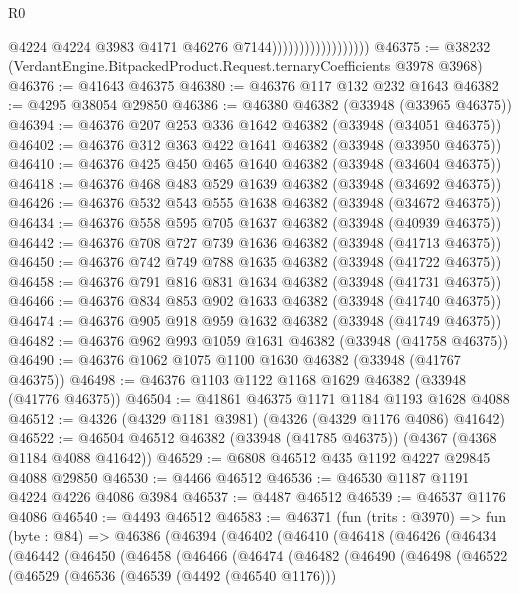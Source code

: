 \begin{lexlean}{R0}
\begin{coremodule}
                                        @4224
                                        @4224
                                        @3983
                                        @4171
                                        @46276
                                        @7144))))))))))))))))))
@46375 := @38232 (VerdantEngine.BitpackedProduct.Request.ternaryCoefficients @3978 @3968)
@46376 := @41643 @46375
@46380 := @46376 @117 @132 @232 @1643
@46382 := @4295 @38054 @29850
@46386 := @46380 @46382 (@33948 (@33965 @46375))
@46394 := @46376 @207 @253 @336 @1642 @46382 (@33948 (@34051 @46375))
@46402 := @46376 @312 @363 @422 @1641 @46382 (@33948 (@33950 @46375))
@46410 := @46376 @425 @450 @465 @1640 @46382 (@33948 (@34604 @46375))
@46418 := @46376 @468 @483 @529 @1639 @46382 (@33948 (@34692 @46375))
@46426 := @46376 @532 @543 @555 @1638 @46382 (@33948 (@34672 @46375))
@46434 := @46376 @558 @595 @705 @1637 @46382 (@33948 (@40939 @46375))
@46442 := @46376 @708 @727 @739 @1636 @46382 (@33948 (@41713 @46375))
@46450 := @46376 @742 @749 @788 @1635 @46382 (@33948 (@41722 @46375))
@46458 := @46376 @791 @816 @831 @1634 @46382 (@33948 (@41731 @46375))
@46466 := @46376 @834 @853 @902 @1633 @46382 (@33948 (@41740 @46375))
@46474 := @46376 @905 @918 @959 @1632 @46382 (@33948 (@41749 @46375))
@46482 := @46376 @962 @993 @1059 @1631 @46382 (@33948 (@41758 @46375))
@46490 := @46376 @1062 @1075 @1100 @1630 @46382 (@33948 (@41767 @46375))
@46498 := @46376 @1103 @1122 @1168 @1629 @46382 (@33948 (@41776 @46375))
@46504 := @41861 @46375 @1171 @1184 @1193 @1628 @4088
@46512 := @4326 (@4329 @1181 @3981) (@4326 (@4329 @1176 @4086) @41642)
@46522 := @46504 @46512 @46382 (@33948 (@41785 @46375)) (@4367 (@4368 @1184 @4088 @41642))
@46529 := @6808 @46512 @435 @1192 @4227 @29845 @4088 @29850
@46530 := @4466 @46512
@46536 := @46530 @1187 @1191 @4224 @4226 @4086 @3984
@46537 := @4487 @46512
@46539 := @46537 @1176 @4086
@46540 := @4493 @46512
@46583 := @46371
    (fun (trits : @3970) =>
    fun (byte : @84) =>
    @46386
      (@46394
        (@46402
          (@46410
            (@46418
              (@46426
                (@46434
                  (@46442
                    (@46450
                      (@46458
                        (@46466
                          (@46474
                            (@46482
                              (@46490
                                (@46498
                                  (@46522
                                    (@46529
                                      (@46536
                                        (@46539 (@4492 (@46540 @1176)))

\end{coremodule}
\end{lexlean}
